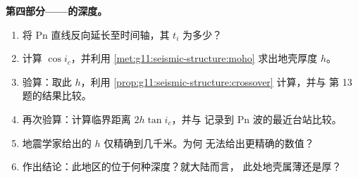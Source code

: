 \begin{problem}
\medskip
\noindent\textbf{第四部分——的深度。}
\begin{enumerate}[resume]
  \item 将 Pn 直线反向延长至时间轴，其
        $t_i$ 为多少？
  \item 计算 $\cos i_c$，并利用
        \cref{met:g11:seismic-structure:moho} 求出地壳厚度 $h$。
  \item 验算：取此 $h$，利用
        \cref{prop:g11:seismic-structure:crossover} 计算，并与
        第 13 题的结果比较。
  \item 再次验算：计算临界距离 $2h\tan i_c$，并与
        记录到 Pn 波的最近台站比较。
  \item 地震学家给出的 $h$ 仅精确到几千米。为何
        无法给出更精确的数值？
  \item 作出结论：此地区的位于何种深度？就大陆而言，
        此处地壳属薄还是厚？
\end{enumerate}
\end{problem}
